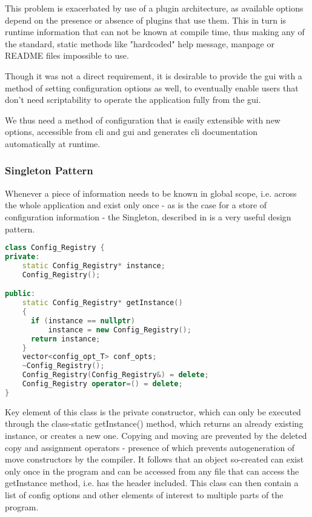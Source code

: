 This problem is exacerbated by use of a plugin architecture, as available options depend on the presence or absence of plugins that use them. This in turn is runtime information that can not be known at compile time, thus making any of the standard, static methods like "hardcoded" help message, manpage or README files impossible to use.

Though it was not a direct requirement, it is desirable to provide the \gls{gui} with a method of setting configuration options as well, to eventually enable users that don't need scriptability to operate the application fully from the \gls{gui}.

We thus need a method of configuration that is easily extensible with new options, accessible from \gls{cli} and \gls{gui} and generates \gls{cli} documentation automatically at runtime.

\subsubsection{Singleton Pattern}
\label{sec:ston}
Whenever a piece of information needs to be known in global scope, i.e. across the whole application and exist only once - as is the case for a store of configuration information - the Singleton, described in \citet[pp. 127ff]{Gamma1994} is a very useful design pattern. 

\begin{lstlisting}[caption=Singleton Implementation in C++, language=c++]
class Config_Registry {
private:
    static Config_Registry* instance; 
    Config_Registry();

public:
    static Config_Registry* getInstance()
    {
      if (instance == nullptr)
          instance = new Config_Registry();
      return instance;
    }
    vector<config_opt_T> conf_opts;
    ~Config_Registry();
    Config_Registry(Config_Registry&) = delete;
    Config_Registry operator=() = delete;
}

\end{lstlisting}
Key element of this class is the private constructor, which can only be executed through the class-static getInstance() method, which returns an already existing instance, or creates a new one.
Copying and moving are prevented by the deleted copy and assignment operators - presence of which prevents autogeneration of move constructors by the compiler.
It follows that an object so-created can exist only once in the program and can be accessed from any file that can access the getInstance method, i.e. has the header included. 
This class can then contain a list of config options and other elements of interest to multiple parts of the program. 

